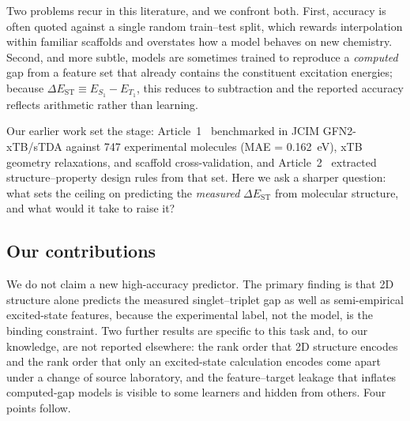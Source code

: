 Two problems recur in this literature, and we confront both. First, accuracy is
often quoted against a single random train--test split, which rewards
interpolation within familiar scaffolds and overstates how a model behaves on new
chemistry. Second, and more subtle, models are sometimes trained to reproduce a
\emph{computed} gap from a feature set that already contains the constituent
excitation energies; because $\Delta E_\text{ST}\equiv E_{S_1}-E_{T_1}$, this
reduces to subtraction and the reported accuracy reflects arithmetic rather than
learning.

Our earlier work set the stage: Article~1~\cite{Tchapet2024_xTB} benchmarked in JCIM
GFN2-xTB/sTDA against \num{747} experimental molecules
(MAE = \qty{0.162}{\electronvolt}), xTB geometry relaxations, and scaffold
cross-validation, and Article~2~\cite{Tchapet2024_DataDriven}
extracted structure--property design rules from that set. Here we ask a sharper question: what sets the ceiling on predicting the
\emph{measured} $\Delta E_{\text{ST}}$ from molecular structure, and what would it
take to raise it?

\subsection{Our contributions}

We do not claim a new high-accuracy predictor. The primary finding is that 2D
structure alone predicts the measured singlet--triplet gap as well as semi-empirical
excited-state features, because the experimental label, not the model, is the binding
constraint. Two further results are specific to this task and, to our knowledge, are
not reported elsewhere: the rank order that 2D structure encodes and the rank order
that only an excited-state calculation encodes come apart under a change of source
laboratory, and the feature--target leakage that inflates computed-gap models is
visible to some learners and hidden from others. Four points follow.

